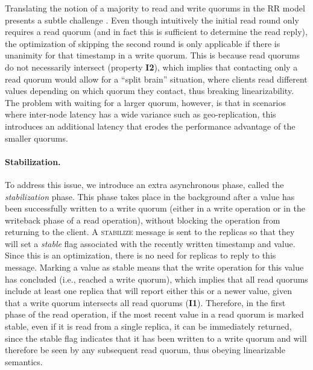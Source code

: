 Translating the notion of a majority to read and write quorums in the
\ac{RR} model presents a subtle challenge . Even though
intuitively the initial read round only requires a read quorum (and in
fact this is sufficient to determine the read reply), the optimization
of skipping the second round is only applicable if there is unanimity
for that timestamp in a write quorum. This is because read quorums do
not necessarily intersect (property \textbf{I2}), which implies that
contacting only a read quorum would allow for a ``split brain''
situation, where clients read different values depending on which
quorum they contact, thus breaking linearizability. The problem with
waiting for a larger quorum, however, is that in scenarios
where inter-node latency has a wide variance such as geo-replication,
this introduces an additional latency that erodes the performance
advantage of the smaller quorums.





\paragraph{Stabilization.}
To address this issue, we introduce an extra asynchronous phase,
called the \emph{stabilization} phase. This phase takes
place in the background after a value has been successfully
written to a write quorum (either in a write operation or in the
writeback phase of a read operation), without
blocking the operation from returning to the client. A
\textsc{stabilize} message is sent to the replicas so that they
will set a \emph{stable} flag associated with the recently
written timestamp and value. Since this is an optimization, there
is no need for replicas to reply to this message.  Marking a
value as stable means that the write operation for this value has
concluded (i.e., reached a write quorum), which implies that all
read quorums include at least one replica that will report either
this or a newer value, given that a write quorum intersects all
read quorums (\textbf{I1}). Therefore, in the first phase of the
read operation, if the most recent value in a read quorum is
marked stable, even if it is read from a single replica, it can
be immediately returned, since the stable flag indicates that it
has been written to a write quorum and will therefore be seen by
any subsequent read quorum, thus obeying linearizable semantics.

